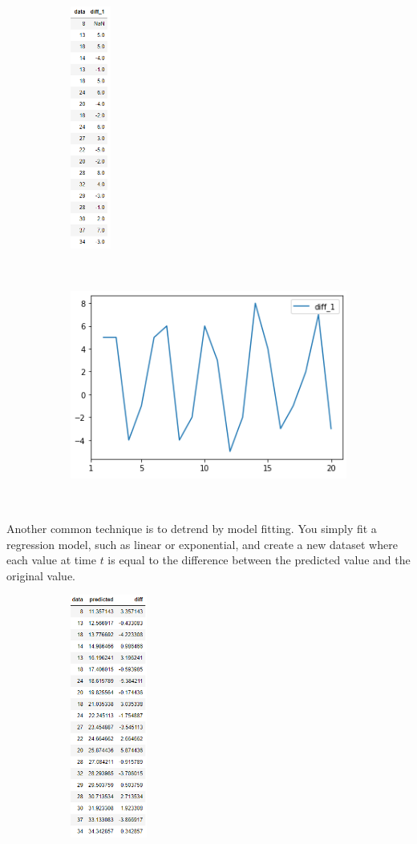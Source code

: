\documentclass{article}
\begin{document}
\begin{flushleft}
    \begin{figure}[H]
      \centering
      \begin{subfigure}[b]{0.2\linewidth}
        \includegraphics[height=80mm]{diff_numbers.png}
      \end{subfigure}
      \begin{subfigure}[b]{0.7\linewidth}
        \includegraphics[height=80mm, width=120mm]{diff_plot.png}
      \end{subfigure}
    \end{figure}
    Another common technique is to detrend by model fitting. You simply fit a regression model, such as linear or exponential, and create a new dataset where each value at time $t$ is equal to the difference between the predicted value and the original value.
    \begin{figure}[H]
      \centering
      \begin{subfigure}[b]{0.3\linewidth}
        \includegraphics[height=80mm]{regression_data.png}

\end{subfigure}
\end{figure}
\end{flushleft}
\end{document}
